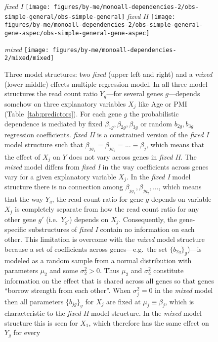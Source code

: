 \documentclass[letterpaper]{article}
\begin{document}
\begin{figure}[H]
\begin{center}
\emph{fixed I}
\texttt{[image: figures/by-me/monoall-dependencies-2/obs-simple-general/obs-simple-general]}
\hspace{\fill}
\emph{fixed II}
\texttt{[image: figures/by-me/monoall-dependencies-2/obs-simple-general-gene-aspec/obs-simple-general-gene-aspec]}

\emph{mixed}
\texttt{[image: figures/by-me/monoall-dependencies-2/mixed/mixed]}
\end{center}
\caption{ Three model structures: two \emph{fixed} (upper left and right) and
a \emph{mixed} (lower middle) effects multiple regression model.  In all three
model structures the read count ratio \(Y_g\)---for several genes
\(g\)---depends somehow on three explanatory variables \(X_j\) like Age or PMI
(Table~\ref{tab:predictors}).  For each gene \(g\) the probabilistic
dependence is mediated by fixed \(\beta_{1g},\beta_{2g},\beta_{3g}\) or random
\(b_{2g},b_{3g}\) regression coefficients.  \emph{fixed II} is a constrained
version of the \emph{fixed I} model structure such that
\(\beta_{jg_1}=\beta_{jg_2}=...\equiv \beta_j\), which means that the effect
of \(X_j\) on \(Y\) does not vary across genes in \emph{fixed II}.  The
\emph{mixed} model differs from \emph{fixed I}  in the way coefficients across
genes vary for a given explanatory variable \(X_j\).  In the \emph{fixed I}
model structure there is no connection among
\(\beta_{jg_1},\beta_{jg_2},...\), which means that the way \(Y_{g}\), the
read count ratio for gene \(g\) depends on variable \(X_j\) is completely
separate from how the read count ratio for any other gene \(g'\)
(i.e.~\(Y_{g'}\)) depends on \(X_j\).  Consequently, the gene-specific
substructures of \emph{fixed I} contain no information on each other.  This
limitation is overcome with the \emph{mixed} model structure because a set of
coefficients across genes---e.g.~the set \(\{b_{2g}\}_g\))---is modeled as a
random sample from a normal distribution with parameters \(\mu_2\) and some
\(\sigma^2_2>0\).  Thus \(\mu_2\) and \(\sigma^2_2\) constitute information on
the effect that is shared across all genes so that genes ``borrow strength
from each other''.  When \(\sigma^2_j=0\) in the \emph{mixed} model then all parameters \(\{b_{jg}\}_g\) for
\(X_j\) are fixed at \(\mu_j\equiv\beta_j\), which is characteristic to the
\emph{fixed II} model structure.  In the \emph{mixed} model structure this is
seen for \(X_1\), which therefore has the same effect on \(Y_g\) for every
}
\end{figure}
\end{document}
